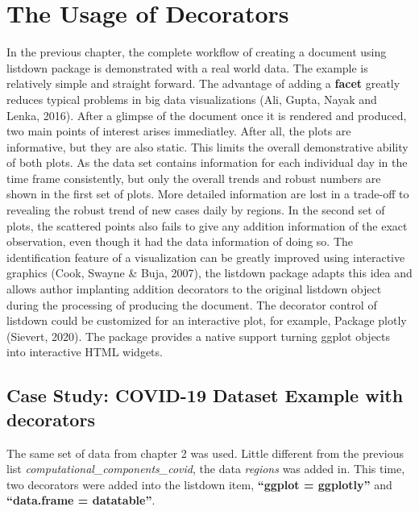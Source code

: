 \documentclass[
]{article}
\begin{document}
\hypertarget{the-usage-of-decorators}{%
\section{The Usage of Decorators}\label{the-usage-of-decorators}}

In the previous chapter, the complete workflow of creating a document
using listdown package is demonstrated with a real world data. The
example is relatively simple and straight forward. The advantage of
adding a \textbf{facet} greatly reduces typical problems in big data
visualizations (Ali, Gupta, Nayak and Lenka, 2016). After a glimpse of
the document once it is rendered and produced, two main points of
interest arises immediatley. After all, the plots are informative, but
they are also static. This limits the overall demonstrative ability of
both plots. As the data set contains information for each individual day
in the time frame consistently, but only the overall trends and robust
numbers are shown in the first set of plots. More detailed information
are lost in a trade-off to revealing the robust trend of new cases daily
by regions. In the second set of plots, the scattered points also fails
to give any addition information of the exact observation, even though
it had the data information of doing so. The identification feature of a
visualization can be greatly improved using interactive graphics (Cook,
Swayne \& Buja, 2007), the listdown package adapts this idea and allows
author implanting addition decorators to the original listdown object
during the processing of producing the document. The decorator control
of listdown could be customized for an interactive plot, for example,
Package plotly (Sievert, 2020). The package provides a native support
turning ggplot objects into interactive HTML widgets.

\hypertarget{case-study-covid-19-dataset-example-with-decorators}{%
\subsection{Case Study: COVID-19 Dataset Example with
decorators}\label{case-study-covid-19-dataset-example-with-decorators}}

The same set of data from chapter 2 was used. Little different from the
previous list \emph{computational\_components\_covid}, the data
\emph{regions} was added in. This time, two decorators were added into
the listdown item, \textbf{``ggplot = ggplotly''} and
\textbf{``data.frame = datatable''}.
\end{document}
